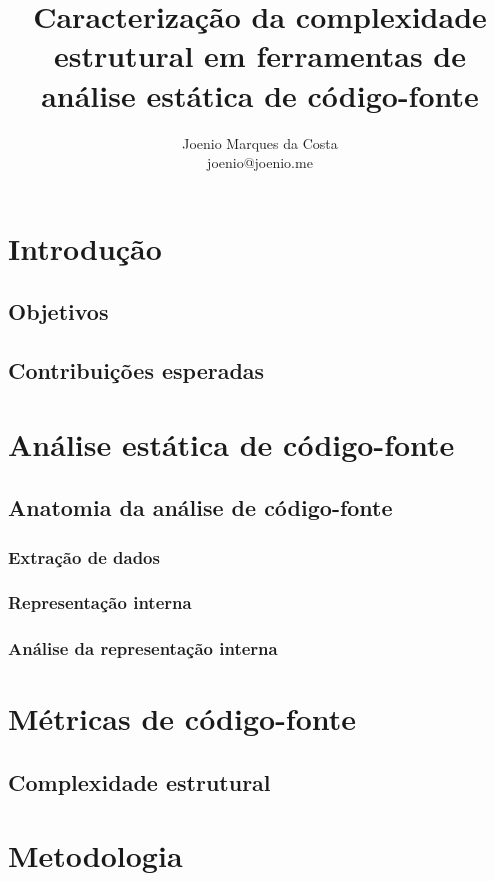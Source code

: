 \documentclass[qual, classic, a4paper]{ufbathesis}
\title{
  Caracterização da complexidade estrutural em ferramentas de análise estática
  de código-fonte
}
\author{Joenio Marques da Costa\\
  {\small joenio@joenio.me}
}
\begin{document}

\tableofcontents

\chapter{Introdução}

\section{Objetivos}

\section{Contribuições esperadas}

\chapter{Análise estática de código-fonte}

\section{Anatomia da análise de código-fonte}

\subsection{Extração de dados}

\subsection{Representação interna}

\subsection{Análise da representação interna}

\chapter{Métricas de código-fonte}

\section{Complexidade estrutural}

\chapter{Metodologia}
\end{document}
